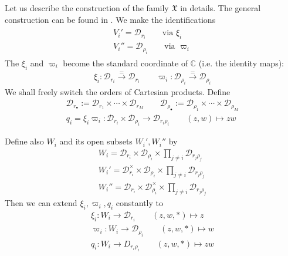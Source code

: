 \documentclass[11pt,b5paper,notitlepage]{article}
\theoremstyle{definition}
\theoremstyle{plain}
\newcommand{\mc}{\mathcal}
\newcommand{\wht}{\widehat}
\newcommand{\blt}{\bullet}
\newcommand{\Cbb}{\mathbb C}
\newcommand{\<}{\left\langle}
\renewcommand{\>}{\right\rangle}
\newcommand{\fx}{\mathfrak{X}}
\newcommand{\MD}{\mathcal{D}}
\numberwithin{equation}{subsection}
\begin{document}
Let us describe the construction of the family $\fx$ in details. The general construction can be found in \cite[Sec. 3]{Gui-sewingconvergence}. We make the identifications
\begin{gather}\label{eq22}
\begin{gathered}
V_i'=\mc D_{r_i}\qquad \text{via }\xi_i\\
V_i''=\mc D_{\rho_i}\qquad \text{via }\varpi_i
\end{gathered}
\end{gather}
The $\xi_i$ and $\varpi_i$ become  the standard coordinate of $\Cbb$ (i.e. the identity maps):
\begin{gather*}
\xi_i:\mc D_{r_i}\xrightarrow{=}\mc D_{r_i}\qquad \varpi_i:\mc D_{\rho_i}\xrightarrow{=}\mc D_{\rho_i}
\end{gather*}
We shall freely switch the orders of Cartesian products. Define 
\begin{gather*}
    \MD_{r_\blt}:=\MD_{r_1}\times \cdots \times \MD_{r_M}\qquad\MD_{\rho_\blt}:=\MD_{\rho_1}\times \cdots \times \MD_{\rho_M}\\
q_i=\xi_i\varpi_i:\MD_{r_i}\times \MD_{\rho_i}\rightarrow \MD_{r_i\rho_i}\qquad (z,w)\mapsto zw
\end{gather*}
\begin{comment}
Clearly, for each $1\leq i\leq R$, $q_{\blt\backslash i}:=(q_1,\cdots, \wht{q_{i}},\cdots ,q_R)$ is a coordinate of
\begin{align*}
  q_{\blt\backslash i}:=(q_1,\cdots, \wht{q_{i}},\cdots ,q_R)  \prod_{j\ne i} \MD_{r_j\rho_j}\rightarrow 
\end{align*}
for each $1\leq i\leq R$. 
\end{comment}
Define also $W_i$ and its open subsets $W_i',W_i''$ by
\begin{subequations}\label{eq44}
\begin{gather}
W_i=\MD_{r_i}\times\MD_{\rho_i}\times \prod_{j\ne i} \MD_{r_j\rho_j}\\
W_i'=\MD_{r_i}^\times \times \MD_{\rho_i}\times \prod_{j\ne i} \MD_{r_j\rho_j}\\
W_i''=\MD_{r_i} \times \MD_{\rho_i}^\times\times \prod_{j\ne i} \MD_{r_j\rho_j}
\end{gather}
\end{subequations}
Then we can extend $\xi_i,\varpi_i,q_i$ constantly to 
\begin{subequations}\label{eq29}
\begin{gather}
    \xi_i:W_i\rightarrow \MD_{r_i}  \qquad (z,w,*)\mapsto z\\
    \varpi_i:W_i\rightarrow \MD_{\rho_i}\qquad (z,w,*)\mapsto w\\
q_i:W_i\rightarrow D_{r_i\rho_i} \qquad (z,w,*)\mapsto zw
\end{gather}
\end{subequations}
\end{document}
